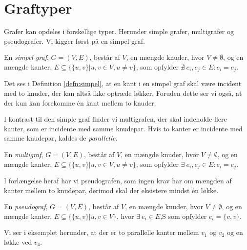 \section{Graftyper}
Grafer kan opdeles i forskellige typer. Herunder simple grafer, multigrafer og pseudografer. Vi kigger først på en simpel graf.

\begin{defn} \label{defn:simpel}
En \emph{simpel graf}, $G=(V,E)$, består af $V$, en mængde knuder, hvor $V \neq \emptyset$, og en mængde kanter, $E \subseteq \{\{u,v\}|u,v \in V, u \neq v\}$, som opfylder $\nexists \ e_i, e_j \in E : e_i = e_j$.
\end{defn}

Det ses i Definition \autoref{defn:simpel}, at en kant i en simpel graf skal være incident med to knuder, der kan altså ikke optræde løkker. Foruden dette ser vi også, at der kun kan forekomme én kant mellem to knuder.



I kontrast til den simple graf finder vi multigrafen, der skal indeholde flere kanter, som er incidente med samme knudepar. Hvis to kanter er incidente med samme knudepar, kaldes de \emph{parallelle}.

\begin{defn}[Multigraf] \label{defn:multi}
En \emph{multigraf}, $ G = (V,E)$, består af $V$, en mængde knuder, hvor $V \neq \emptyset$, og en mængde kanter,
$E \subseteq \{\{u,v\}|u,v \in V, u \neq v\}$, som opfylder $\exists \ e_i, e_j \in E : e_i = e_j$.
\end{defn}



I forlængelse heraf har vi pseudografen, som ingen krav har om mængden af kanter mellem to knudepar, derimod skal der eksistere mindst én løkke. 

\begin{defn}[Pseudograf] \label{defn:pseudo}
En \emph{pseudograf}, $ G = (V,E)$, består af $V$, en mængde knuder, hvor $V \neq \emptyset$, og en mængde kanter, $E \subseteq \{\{u,v\}|u,v \in V\}$, hvor $\exists \ e_i \in E$,S som opfylder $e_i = \{v,v\}$.
\end{defn}

Vi ser i eksemplet herunder, at der er to parallelle kanter mellem $v_{1}$ og $v_{2}$ og en løkke ved $v_{4}$.




